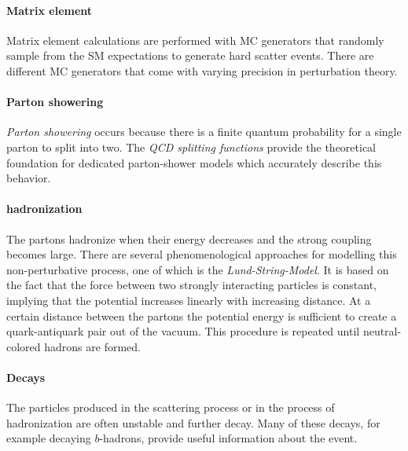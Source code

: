 
\paragraph{Matrix element}
Matrix element calculations are performed with MC generators that randomly sample from the SM expectations to generate hard scatter events. 
There are different MC generators that come with varying precision in perturbation theory. 

\paragraph{Parton showering}
\emph{Parton showering} occurs because there is a finite quantum probability for a single parton to split into two. The \emph{QCD splitting functions} \cite{Altarelli:1977zs} provide the theoretical foundation for dedicated parton-shower models which accurately describe this behavior.
\paragraph{hadronization}
The partons hadronize when their energy decreases and the strong coupling becomes large. There are several phenomenological approaches for modelling this non-perturbative process, one of which is the \emph{Lund-String-Model}. 
It is based on the fact that the force between two strongly interacting particles is constant, implying that the potential increases linearly with increasing distance.
At a certain distance between the partons the potential energy is sufficient to create a quark-antiquark pair out of the vacuum. This procedure is repeated until neutral-colored hadrons are formed.
\paragraph{Decays}
The particles produced in the scattering process or in the process of hadronization are often unstable and further decay. Many of these decays, for example decaying $b$-hadrons, provide useful information about the event. %
